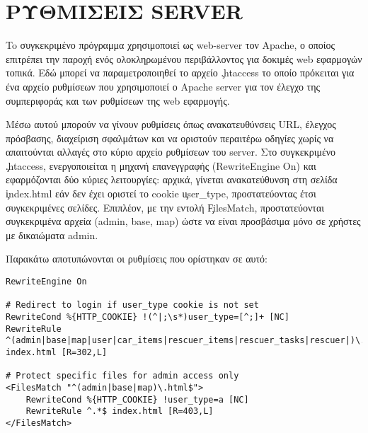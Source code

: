 \chapter{ΡΥΘΜΙΣΕΙΣ SERVER}
    To συγκεκριμένο πρόγραμμα χρησιμοποιεί ως web-server τον Apache, ο οποίος επιτρέπει την παροχή ενός ολοκληρωμένου περιβάλλοντος για δοκιμές web εφαρμογών τοπικά.
    Εδώ μπορεί να παραμετροποιηθεί το αρχείο \c{.htaccess} το οποίο πρόκειται για ένα αρχείο ρυθμίσεων που χρησιμοποιεί ο Apache server για τον έλεγχο της συμπεριφοράς και των ρυθμίσεων της web εφαρμογής.

    Μέσω αυτού μπορούν να γίνουν ρυθμίσεις όπως ανακατευθύνσεις URL, έλεγχος πρόσβασης, διαχείριση σφαλμάτων και να οριστούν περαιτέρω οδηγίες χωρίς να απαιτούνται αλλαγές στο κύριο αρχείο ρυθμίσεων του server.
    Στο συγκεκριμένο \c{.htaccess}, ενεργοποιείται η μηχανή επανεγγραφής (RewriteEngine On) και εφαρμόζονται δύο κύριες λειτουργίες: αρχικά, γίνεται ανακατεύθυνση στη σελίδα \c{index.html} εάν δεν έχει οριστεί το cookie \c{user\_type}, προστατεύοντας έτσι συγκεκριμένες σελίδες.
    Επιπλέον, με την εντολή \c{\<FilesMatch\>}, προστατεύονται συγκεκριμένα αρχεία (admin, base, map) ώστε να είναι προσβάσιμα μόνο σε χρήστες με δικαιώματα admin.

    Παρακάτω αποτυπώνονται οι ρυθμίσεις που ορίστηκαν σε αυτό:

    \begin{lstlisting}
RewriteEngine On

# Redirect to login if user_type cookie is not set
RewriteCond %{HTTP_COOKIE} !(^|;\s*)user_type=[^;]+ [NC]
RewriteRule ^(admin|base|map|user|car_items|rescuer_items|rescuer_tasks|rescuer|)\.html$ index.html [R=302,L]

# Protect specific files for admin access only
<FilesMatch "^(admin|base|map)\.html$">
    RewriteCond %{HTTP_COOKIE} !user_type=a [NC]
    RewriteRule ^.*$ index.html [R=403,L]
</FilesMatch>
    \end{lstlisting}
